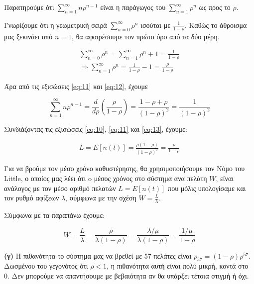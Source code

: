 \documentclass {article}
\begin{document}
Παρατηρούμε ότι $\sum_{n=1}^{\infty}{n ρ^{n-1}}$ είναι η παράγωγος του $\sum_{n=1}^{\infty}{ρ^n}$ ως προς το $ρ$. 

Γνωρίζουμε ότι η γεωμετρική σειρά $\sum_{n=0}^{\infty}{ρ^n}$ ισούται με $\frac{1}{1-ρ}$. Καθώς το άθροισμα μας ξεκινάει από $n = 1$, θα αφαιρέσουμε τον πρώτο όρο από τα δύο μέρη.

\begin{equation} \label{eq:12}
	\begin{split}
		\sum_{n=0}^{\infty}{ρ^n} = \sum_{n=1}^{\infty}{ρ^n} + 1 = \frac{1}{1-ρ}\\
	\Rightarrow \sum_{n=1}^{\infty}{ρ^n} = \frac{1}{1-ρ} - 1 = \frac{ρ}{1-ρ}
	\end{split}
\end{equation}

Άρα από τις εξισώσεις \ref{eq:11} και \ref{eq:12}, έχουμε 

\begin{equation} \label{eq:13}
	\sum_{n=1}^{\infty}{nρ^{n-1}} = \frac{d}{dρ}(\frac{ρ}{1-ρ}) = \frac{1-ρ+ρ}{(1-ρ)^2} = \frac{1}{(1-ρ)^2} 
\end{equation}

Συνδιάζοντας τις εξισώσεις \ref{eq:10}, \ref{eq:11} και \ref{eq:13}, έχουμε:

\begin{equation}
	\begin{split}
		L = E[n(t)] = \frac{ρ(1-ρ)}{(1-ρ)^2} = \frac{ρ}{1-ρ}
	\end{split}	
\end{equation}

Για να βρούμε τον μέσο χρόνο καθυστέρησης, θα χρησιμοποιήσουμε τον Νόμο του \foreignlanguage{english}{Little}, ο οποίος μας λέει ότι o μέσος χρόνος στο σύστημα ανα πελάτη $W$, είναι ανάλογος με τον μέσο αριθμό πελατών $L = E[n(t)]$ που μόλις υπολογίσαμε και τον ρυθμό αφίξεων $λ$, σύμφωνα με την σχέση $W = \frac{L}{λ}$.

Σύμφωνα με τα παραπάνω έχουμε:

\begin{equation}
	W = \frac{L}{λ} = \frac{ρ}{λ(1-ρ)} = \frac{λ / μ}{λ(1-ρ)} = \frac{1 / μ}{1-ρ}
\end{equation}

\textbf{(γ)} Η πιθανότητα το σύστημα μας να βρεθεί με 57 πελάτες είναι $p_{57} = (1-ρ)ρ^{57}$. Δωσμένου του γεγονότος ότι $ρ < 1$, η πιθανότητα αυτή είναι πολύ μικρή, κοντά στο 0. Δεν μπορούμε να απαντήσουμε με βεβαιότητα αν θα υπάρξει τέτοια στιγμή ή όχι.
\end{document}
